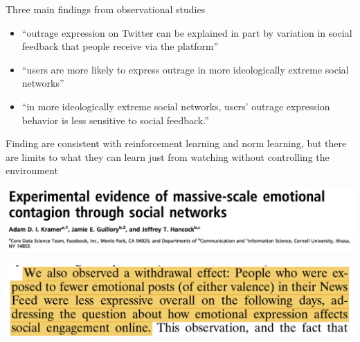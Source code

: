 \documentclass[aspectratio=169]{beamer}
\begin{document}
\begin{frame} 

Three main findings from observational studies
\begin{itemize}
\item ``outrage expression on Twitter can be explained in part by variation in social feedback that people receive via the platform'' \pause
\item ``users are more likely to express outrage in more ideologically extreme social networks'' \pause
\item ``in more ideologically extreme social networks, users' outrage expression behavior is less sensitive to social feedback.''
\end{itemize}

\vfill
Finding are consistent with reinforcement learning and norm learning, but there are limits to what they can learn just from watching without controlling the environment

\end{frame}
\begin{frame}

\begin{center}
\includegraphics[width=\textwidth]{figures/kramer_experimental_2014_title}
\end{center}

\vfill

\begin{center}
\includegraphics[width=\textwidth]{figures/kramer_experimental_2014_withdraw_effect}
\end{center}

\end{frame}
\end{document}
